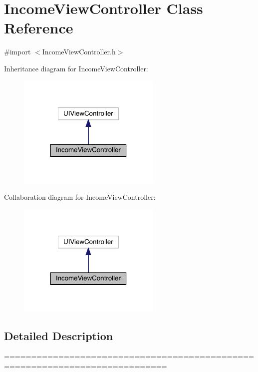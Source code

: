 \hypertarget{interface_income_view_controller}{}\section{Income\+View\+Controller Class Reference}
\label{interface_income_view_controller}


{\ttfamily \#import $<$Income\+View\+Controller.\+h$>$}



Inheritance diagram for Income\+View\+Controller\+:\nopagebreak
\begin{figure}[H]
\begin{center}
\leavevmode
\includegraphics[width=194pt]{interface_income_view_controller__inherit__graph}
\end{center}
\end{figure}


Collaboration diagram for Income\+View\+Controller\+:\nopagebreak
\begin{figure}[H]
\begin{center}
\leavevmode
\includegraphics[width=194pt]{interface_income_view_controller__coll__graph}
\end{center}
\end{figure}


\subsection{Detailed Description}
============================================================================

